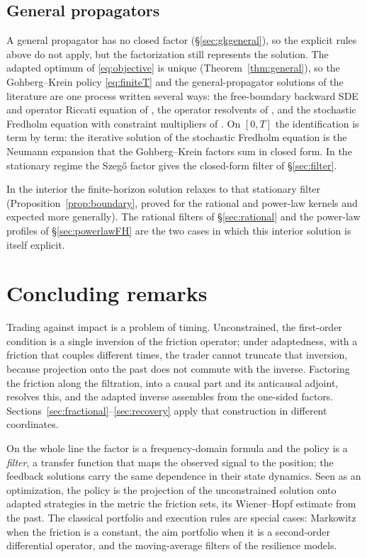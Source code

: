 \documentclass[11pt]{article}
\theoremstyle{plain}
\theoremstyle{definition}
\theoremstyle{remark}
\begin{document}
\subsection{General propagators}\label{sec:general}

A general propagator has no closed factor (\S\ref{sec:gkgeneral}), so the explicit rules above do not apply, but the factorization still represents the solution. The adapted optimum of \eqref{eq:objective} is unique (Theorem~\ref{thm:general}), so the Gohberg--Krein policy \eqref{eq:finiteT} and the general-propagator solutions of the literature are one process written several ways: the free-boundary backward SDE and operator Riccati equation of \citet{AbiJaberNeuman2025}, the operator resolvents of \citet{AbiJaberNeumanTuschmann2024}, and the stochastic Fredholm equation with constraint multipliers of \citet{AbiJaberDeCarvalhoPham2024}. On $[0,T]$ the identification is term by term: the iterative solution of the stochastic Fredholm equation is the Neumann expansion that the Gohberg--Krein factors sum in closed form. In the stationary regime the Szeg\H{o} factor gives the closed-form filter of \S\ref{sec:filter}.

In the interior the finite-horizon solution relaxes to that stationary filter (Proposition~\ref{prop:boundary}, proved for the rational and power-law kernels and expected more generally). The rational filters of \S\ref{sec:rational} and the power-law profiles of \S\ref{sec:powerlawFH} are the two cases in which this interior solution is itself explicit.

\section{Concluding remarks}\label{sec:conclusion}

Trading against impact is a problem of timing. Unconstrained, the first-order condition is a single inversion of the friction operator; under adaptedness, with a friction that couples different times, the trader cannot truncate that inversion, because projection onto the past does not commute with the inverse. Factoring the friction along the filtration, into a causal part and its anticausal adjoint, resolves this, and the adapted inverse assembles from the one-sided factors. Sections~\ref{sec:fractional}--\ref{sec:recovery} apply that construction in different coordinates.

On the whole line the factor is a frequency-domain formula and the policy is a \emph{filter}, a transfer function that maps the observed signal to the position; the feedback solutions carry the same dependence in their state dynamics. Seen as an optimization, the policy is the projection of the unconstrained solution onto adapted strategies in the metric the friction sets, its Wiener--Hopf estimate from the past. The classical portfolio and execution rules are special cases: Markowitz when the friction is a constant, the aim portfolio when it is a second-order differential operator, and the moving-average filters of the resilience models.
\end{document}

